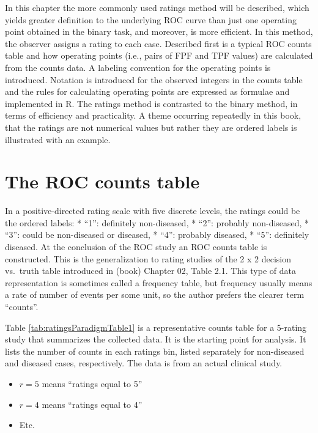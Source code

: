 \documentclass[
]{book}
\providecommand{\tightlist}{%
  \setlength{\itemsep}{0pt}\setlength{\parskip}{0pt}}
\begin{document}
In this chapter the more commonly used ratings method will be described, which yields greater definition to the underlying ROC curve than just one operating point obtained in the binary task, and moreover, is more efficient. In this method, the observer assigns a rating to each case. Described first is a typical ROC counts table and how operating points (i.e., pairs of FPF and TPF values) are calculated from the counts data. A labeling convention for the operating points is introduced. Notation is introduced for the observed integers in the counts table and the rules for calculating operating points are expressed as formulae and implemented in R. The ratings method is contrasted to the binary method, in terms of efficiency and practicality. A theme occurring repeatedly in this book, that the ratings are not numerical values but rather they are ordered labels is illustrated with an example.

\hypertarget{the-roc-counts-table}{%
\section{The ROC counts table}\label{the-roc-counts-table}}

In a positive-directed rating scale with five discrete levels, the ratings could be the ordered labels:
* ``1'': definitely non-diseased,
* ``2'': probably non-diseased,
* ``3'': could be non-diseased or diseased,
* ``4'': probably diseased,
* ``5'': definitely diseased.
At the conclusion of the ROC study an ROC counts table is constructed. This is the generalization to rating studies of the 2 x 2 decision vs.~truth table introduced in (book) Chapter 02, Table 2.1. This type of data representation is sometimes called a frequency table, but frequency usually means a rate of number of events per some unit, so the author prefers the clearer term ``counts''.

Table \ref{tab:ratingsParadigmTable1} is a representative counts table for a 5-rating study that summarizes the collected data. It is the starting point for analysis. It lists the number of counts in each ratings bin, listed separately for non-diseased and diseased cases, respectively. The data is from an actual clinical study.

\begin{itemize}
\tightlist
\item
  \(r = 5\) means ``ratings equal to 5''
\item
  \(r = 4\) means ``ratings equal to 4''
\item
  Etc.
\end{itemize}
\end{document}
